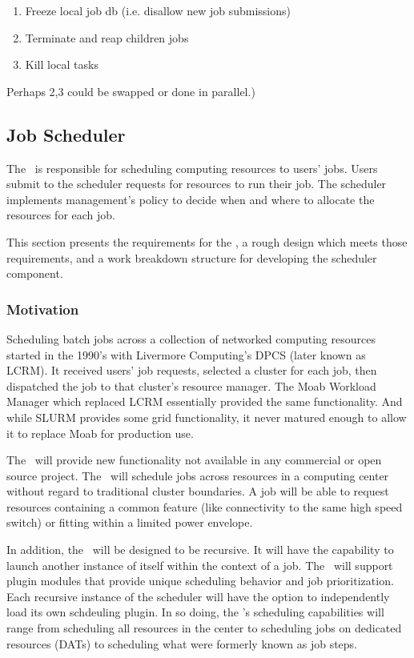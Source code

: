 \begin{enumerate}
\item Freeze local job db (i.e. disallow new job submissions)
\item Terminate and reap children jobs
\item Kill local tasks
\end{enumerate}

Perhaps 2,3 could be swapped or done in parallel.)

\subsection{Job Scheduler}

The \ngjs\ is responsible for scheduling computing resources to users'
jobs.  Users submit to the scheduler requests for resources to run
their job.  The scheduler implements management's policy to decide
when and where to allocate the resources for each job.

This section presents the requirements for the \ngjs, a rough design
which meets those requirements, and a work breakdown structure for
developing the scheduler component.

\subsubsection{Motivation}

Scheduling batch jobs across a collection of networked computing
resources started in the 1990's with Livermore Computing's DPCS (later
known as LCRM).  It received users' job requests, selected a cluster
for each job, then dispatched the job to that cluster's resource
manager.  The Moab Workload Manager which replaced LCRM essentially
provided the same functionality.  And while SLURM provides some grid
functionality, it never matured enough to allow it to replace Moab for
production use.

The \ngjs\ will provide new functionality not available in any
commercial or open source project.  The \ngjs\ will schedule jobs
across resources in a computing center without regard to traditional
cluster boundaries.  A job will be able to request resources
containing a common feature (like connectivity to the same high speed
switch) or fitting within a limited power envelope.

In addition, the \ngjs\ will be designed to be recursive.  It will
have the capability to launch another instance of itself within the
context of a job.  The \ngjs\ will support plugin modules that provide
unique scheduling behavior and job prioritization.  Each recursive
instance of the scheduler will have the option to independently load
its own schdeuling plugin.  In so doing, the \ngjs's scheduling
capabilities will range from scheduling all resources in the center to
scheduling jobs on dedicated resources (DATs) to scheduling what were
formerly known as job steps.

